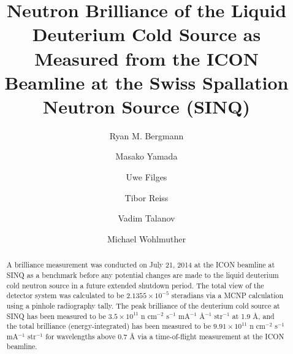 \documentclass[5p,12pt]{elsarticle}
\begin{document}
\begin{frontmatter}



\title{Neutron Brilliance of the Liquid Deuterium Cold Source as Measured from the ICON Beamline at the Swiss Spallation Neutron Source (SINQ)}


\author[]{Ryan M. Bergmann}

\author[]{Masako Yamada}

\author[]{Uwe Filges}

\author[]{Tibor Reiss}

\author[]{Vadim Talanov}

\author[]{Michael Wohlmuther}

\address{Paul Scherrer Institut, Villigen, Switzerland}


\begin{abstract}

A brilliance measurement was conducted on July 21, 2014 at the ICON beamline at SINQ as a benchmark before any potential changes are made to the liquid deuterium cold neutron source in a future extended shutdown period. The total view of the detector system was calculated to be $2.1355\times10^{-5}$ steradians via a MCNP calculation using a pinhole radiography tally.  The peak brilliance of the deuterium cold source at SINQ has been measured to be $3.5\times10^{11}$ n cm$^{-2}$ s$^{-1}$ mA$^{-1}$ \AA$^{-1}$ str$^{-1}$ at 1.9 {\AA}, and the total brilliance (energy-integrated) has been measured to be  $9.91\times10^{11}$  n cm$^{-2}$ s$^{-1}$ mA$^{-1}$ str$^{-1}$ for wavelengths above 0.7 {\AA} via a time-of-flight measurement at the ICON beamline.


\end{abstract}
\end{frontmatter}
\end{document}
